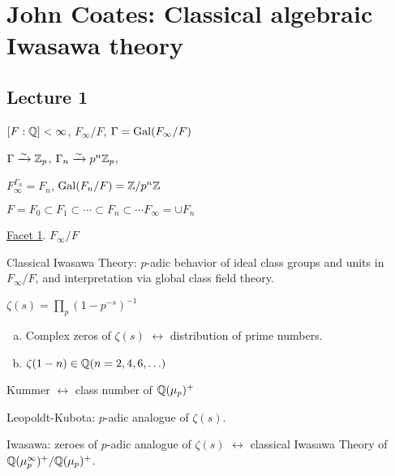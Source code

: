 \newpage
\section{John Coates: Classical algebraic Iwasawa theory}
\subsection{Lecture 1}

$[F:\mathbb{Q}]<\infty$, $F_\infty/F$, $\Gamma=\operatorname{Gal}(F_\infty/F)$

$\Gamma \xrightarrow{\sim} \mathbb{Z}_p$, $\Gamma_n \xrightarrow{\sim} p^n \mathbb{Z}_p$,

$F_\infty^{\Gamma_n}=F_n$, $\operatorname{Gal}(F_n/F)=\mathbb{Z}/p^n\mathbb{Z}$

$F=F_0 \subset F_1 \subset \cdots \subset F_n \subset \cdots F_\infty= \cup F_n$

\underline{Facet 1}. $F_\infty/F$

Classical Iwasawa Theory: $p$-adic behavior of ideal class groups and units in $F_\infty/F$, and interpretation via global class field theory. 

$\zeta(s)= \prod_p (1-p^{-s})^{-1}$
\begin{enumerate}[(a)]
\item Complex zeros of $\zeta(s)$ $\leftrightarrow$ distribution of prime numbers.
\item $\zeta(1-n) \in \mathbb{Q}(n=2,4,6,\ldots)$
\end{enumerate}

Kummer $\leftrightarrow$ class number of $\mathbb{Q}(\mu_p)^+$

Leopoldt-Kubota: $p$-adic analogue of $\zeta(s)$.

Iwasawa: zeroes of $p$-adic analogue of $\zeta(s)$ $\leftrightarrow$ classical Iwasawa Theory of $\mathbb{Q}(\mu_p^{\infty})^+/\mathbb{Q}(\mu_p)^+$.